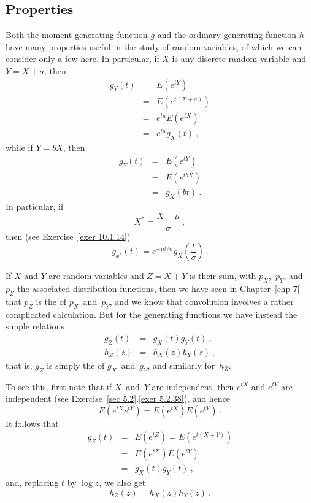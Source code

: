 \subsection*{Properties}
Both the moment generating function $g$ and the ordinary generating function
$h$ have many properties useful in the study of random variables, of which we
can consider only a few here.  In particular, if $X$ is any discrete random 
variable and $Y = X + a$, then
\begin{eqnarray*}
g_Y(t) &=& E(e^{tY}) \\
       &=& E(e^{t(X + a)}) \\
       &=& e^{ta} E(e^{tX}) \\
       &=& e^{ta} g_X(t)\ ,
\end{eqnarray*}
while if $Y = bX$, then
\begin{eqnarray*}
g_Y(t) &=& E(e^{tY}) \\
       &=& E(e^{tbX}) \\
       &=& g_X(bt)\ .
\end{eqnarray*}
In particular, if
$$
X^* = \frac{X - \mu}\sigma\ ,
$$
then (see Exercise~\ref{exer 10.1.14})
$$
g_{x^*}(t) = e^{-\mu t/\sigma} g_X\left( \frac t\sigma \right)\ .
$$

If $X$ and $Y$ are  random variables and $Z = X + Y$ is
their sum, with $p_X$,~$p_Y$, and~$p_Z$ the associated distribution functions, then
we have seen in Chapter~\ref{chp 7} that $p_Z$ is the  of
$p_X$~and~$p_Y$, and we know that convolution involves a rather complicated
calculation.  But for the generating functions we have instead the simple
relations
\begin{eqnarray*}
g_Z(t) &=& g_X(t) g_Y(t)\ , \\
h_Z(z) &=& h_X(z) h_Y(z)\ ,
\end{eqnarray*}
that is, $g_Z$ is simply the  of $g_X$~and~$g_Y$, and similarly
for~$h_Z$.

To see this, first note that if $X$~and~$Y$ are independent, then $e^{tX}$ and
$e^{tY}$ are independent (see Exercise~\ref{sec 5.2}.\ref{exer 5.2.38}), and hence
$$
E(e^{tX} e^{tY}) = E(e^{tX}) E(e^{tY})\ .
$$
It follows that
\begin{eqnarray*}
g_Z(t) &=& E(e^{tZ}) = E(e^{t(X + Y)}) \\
       &=& E(e^{tX}) E(e^{tY}) \\
       &=& g_X(t) g_Y(t)\ ,
\end{eqnarray*}
and, replacing $t$ by $\log z$, we also get
$$
h_Z(z) = h_X(z) h_Y(z)\ .
$$

